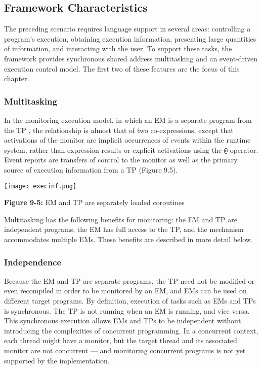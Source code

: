 \subsection*{Framework Characteristics}

The preceding scenario requires language support in several areas:
controlling a program's execution, obtaining execution information,
presenting large quantities of information, and interacting with the user.
To support these tasks, the framework provides synchronous shared address
multitasking and an event-driven execution control model.
 The first two of these features are the focus
of this chapter.

\subsubsection*{Multitasking}

In the monitoring execution model, in which an EM is a separate program
from the TP , the relationship is almost
that of two co-expressions, except that activations of the monitor are
implicit occurrences of events within the runtime system, rather than
expression results or explicit activations using the \texttt{@} operator.
Event reports are transfers of control to the monitor as well as the
primary source of execution information from a TP (Figure 9.5).

\begin{center}
\texttt{[image: execinf.png]}
\end{center}

{\sffamily\bfseries Figure 9-5:}
{\sffamily EM and TP are separately loaded coroutines}

\bigskip


Multitasking has the following benefits for monitoring: the EM and TP are
independent programs, the EM has full access to the TP, and the mechanism
accommodates multiple EMs.  These benefits are described in more detail
below.


\subsubsection*{Independence}

Because the EM and TP are separate programs, the TP need not be
modified or even recompiled in order to be monitored by an EM, and
EMs can be used on different target programs. By definition, execution
of tasks such as EMs and TPs is synchronous.  The TP is not
running when an EM is running, and vice versa.  This synchronous
execution allows EMs and TPs to be independent without introducing the
complexities of concurrent programming. In a concurrent context, each
thread might have a monitor, but the target thread and its associated
monitor are not concurrent --- and monitoring concurrent programs is not
yet supported by the implementation.


